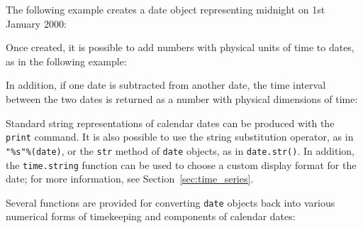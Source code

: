 The following example creates a date object representing midnight on 1st January 2000:

\vspace{3mm}

\vspace{3mm}

Once created, it is possible to add numbers with physical units of time to
dates, as in the following example:

\vspace{3mm}

\vspace{3mm}

\noindent In addition, if one date is subtracted from
another date, the time interval between the two dates is returned as a number
with physical dimensions of time:

\vspace{3mm}

\vspace{3mm}

Standard string representations of calendar dates can be produced with the {\tt
print} command.  It is also possible to use the string substitution operator,
as in {\tt "\%s"\%(date)}, or the {\tt str} method of {\tt date} objects, as in
{\tt date.str()}.  In addition, the {\tt time.string} function can be used to
choose a custom display format for the date; for more information, see
Section~\ref{sec:time_series}.

Several functions are provided for converting {\tt date} objects back into various numerical forms of timekeeping and components of calendar dates:


